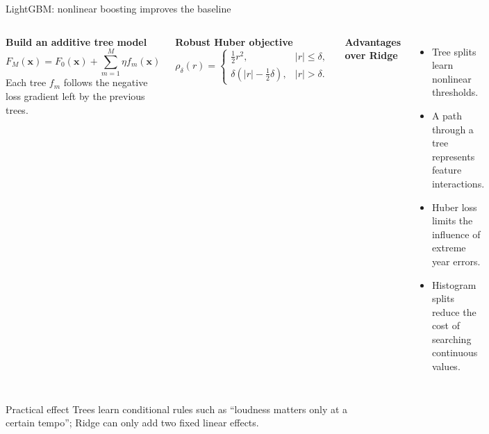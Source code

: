 \begin{frame}{LightGBM: nonlinear boosting improves the baseline}

\small

\begin{columns}[T,onlytextwidth]
	\textbf{Build an additive tree model}
	\[
		F_M(\mathbf{x})=F_0(\mathbf{x})
		+\sum_{m=1}^{M}\eta f_m(\mathbf{x})
	\]
	Each tree $f_m$ follows the negative loss gradient left by the
	previous trees.

	\medskip
	\textbf{Robust Huber objective}
	\[
	\rho_\delta(r)=
	\begin{cases}
		\frac{1}{2}r^2,& |r|\leq\delta,\\
		\delta(|r|-\frac{1}{2}\delta),& |r|>\delta.
	\end{cases}
	\]

	\textbf{Advantages over Ridge}
	\begin{itemize}
		\setlength{\itemsep}{2pt}
		\item Tree splits learn nonlinear thresholds.
		\item A path through a tree represents feature interactions.
		\item Huber loss limits the influence of extreme year errors.
		\item Histogram splits reduce the cost of searching continuous values.
	\end{itemize}
\end{columns}

\medskip
\begin{block}{Practical effect}
Trees learn conditional rules such as ``loudness matters only at a certain
tempo''; Ridge can only add two fixed linear effects.
~{\scriptsize\autocite{ke2017lightgbm,huber1964robust}}
\end{block}

\end{frame}

